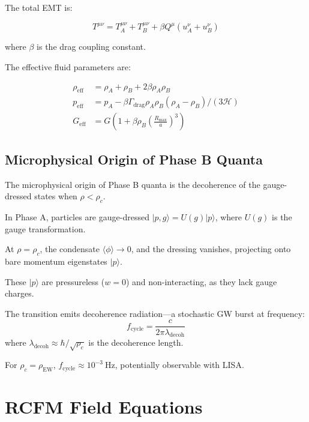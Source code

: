 \documentclass[10pt,twocolumn]{article}
\theoremstyle{definition}
\newcommand{\Rmax}{R_{\max}}
\newcommand{\rhoA}{\rho_{A}}
\newcommand{\rhoB}{\rho_{B}}
\newcommand{\Hcal}{\mathcal{H}}
\newcommand{\Gammadrag}{\Gamma_{\mathrm{drag}}}
\newcommand{\rhoc}{\rho_{c}}
\newcommand{\rhoEW}{\rho_{\mathrm{EW}}}
\begin{document}
The total EMT is:

\begin{equation}
  T^{\mu\nu} = T_{A}^{\mu\nu} + T_{B}^{\mu\nu} + \beta Q^{\mu} (u_{A}^{\nu} + u_{B}^{\nu})
  \label{eq:total-emt}
\end{equation}%


where \( \beta \) is the drag coupling constant.

The effective fluid parameters are:

\begin{align}
  \rho_{\mathrm{eff}} &= \rhoA + \rhoB + 2 \beta \rhoA \rhoB \\
  p_{\mathrm{eff}} &= p_{A} - \beta \Gammadrag \rhoA \rhoB (\rhoA - \rhoB) / (3 \Hcal) \\
  G_{\mathrm{eff}} &= G \left(1 + \beta \rhoB \left(\frac{\Rmax}{a}\right)^{3}\right)
\end{align}%


\subsection{Microphysical Origin of Phase B Quanta}
\label{sec:phaseB-micro}

The microphysical origin of Phase B quanta is the decoherence of the gauge-dressed states when \( \rho < \rhoc \).

In Phase A, particles are gauge-dressed \( |p, g\rangle = U(g) |p\rangle \), where \( U(g) \) is the gauge transformation.

At \( \rho = \rhoc \), the condensate \( \langle \phi \rangle \to 0 \), and the dressing vanishes, projecting onto bare momentum eigenstates \( |p\rangle \).

These \( |p\rangle \) are pressureless (\( w = 0 \)) and non-interacting, as they lack gauge charges.

The transition emits decoherence radiation---a stochastic GW burst at frequency:
\begin{equation}
  f_{\mathrm{cycle}} = \frac{c}{2\pi\lambda_{\mathrm{decoh}}}
  \label{eq:f-cycle}
\end{equation}
where \( \lambda_{\mathrm{decoh}} \approx \hbar / \sqrt{\rhoc} \) is the decoherence length.

For \( \rhoc = \rhoEW \), \( f_{\mathrm{cycle}} \approx 10^{-3} \ \mathrm{Hz} \), potentially observable with LISA.

\section{RCFM Field Equations}
\label{sec:fe}
\end{document}
